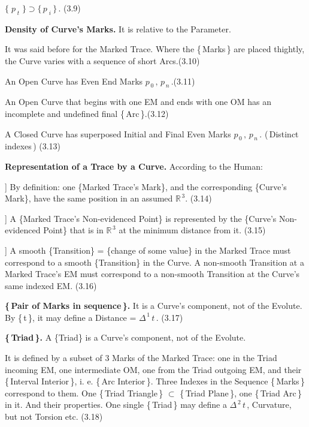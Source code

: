 \documentclass[12pt]{article} %
\begin{document}
\noindent $\{\;p_{\;t}\;\} \supset \{\,p_{\;i}\,\}$\,. \qquad (3.9)

\noindent \textbf{Density of Curve's Marks.} It is relative to the Parameter.

\noindent It was said before for the Marked Trace. Where the \{\,Marks\,\} are placed thightly, the Curve varies with a sequence of short Arcs.\qquad (3.10)  

\noindent An Open Curve has Even End Marks\; $p_{\,0}\,,\,p_{\,n}$\,.\qquad (3.11)

\noindent An Open Curve that begins with one EM and ends with one OM has an incomplete and undefined final \{\,Arc\,\}.\qquad (3.12)
 
\noindent A Closed Curve has superposed Initial and Final Even Marks\; $p_{\,0}\,,\,p_{\,n}$\,. (\,Distinct indexes\,) \qquad (3.13)

\noindent \textbf{Representation of a Trace by a Curve.}\; According to the Human:

] By definition: one \{Marked Trace's Mark\}, and the corresponding \{Curve's Mark\}, have the same position in an assumed $\mathbb{R}^{\,3}$. (3.14)
 
] A \{Marked Trace's Non-evidenced Point\} is represented by the \{Curve's Non-evidenced Point\} that is in $\mathbb{R}^{\,3}$ at the minimum distance from it. (3.15)   

] A smooth \{Transition\} = \{change of some value\} in the Marked Trace must correspond to a smooth \{Transition\} in the Curve. \;A non-smooth Transition at a Marked Trace's EM must correspond to a non-smooth Transition at the Curve's same indexed EM. (3.16)

\noindent \textbf{\{\,Pair of Marks in sequence\,\}.} It is a Curve's component, not of the Evolute. By \{\,t\,\}, it may define a Distance
 = $\Delta^{\,1}\,t$\,. (3.17)

\noindent \textbf{\{\,Triad\,\}.} A \{Triad\} is a Curve's component, not of the Evolute.   

\noindent It is defined by a subset of 3 Marks of the Marked Trace: one in the Triad incoming EM, one intermediate OM, one from the Triad outgoing EM, and their \{\,Interval Interior\,\}, i. e. \{\,Arc Interior\,\}. Three Indexes in the Sequence \{\,Marks\,\} correspond to them. One \{\,Triad Triangle\,\} $\subset$ \{\,Triad Plane\,\}, one \{\,Triad Arc\,\} in it. And their properties. One single \{\,Triad\,\} may define a $\Delta^{\,2}\,t$\,, Curvature, but not Torsion etc. \qquad \qquad (3.18)
\end{document}
